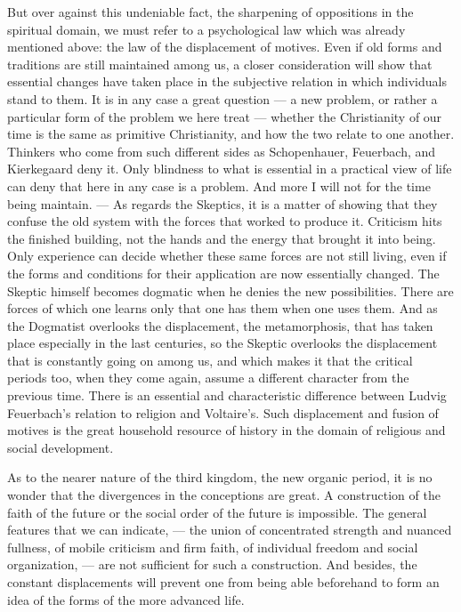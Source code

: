 \documentclass[12pt,a4paper,openany]{book}
\newcommand{\opage}[1]{\marginnote{\footnotesize\textit{[#1]}}}
\begin{document}
But over against this undeniable fact, the sharpening of
oppositions in the spiritual domain, we must refer to
\opage{238}a psychological law which was already mentioned above:
the law of the displacement of motives. Even if old forms and
traditions are still maintained among us, a closer
consideration will show that essential changes have taken place
in the subjective relation in which individuals stand to them.
It is in any case a great question
--- a new problem, or rather a particular form of the
problem we here treat --- whether the Christianity of our time is
the same as primitive Christianity, and how the two
relate to one another. Thinkers who come from such different
sides as Schopenhauer, Feuerbach, and
Kierkegaard deny it. Only blindness to what is essential
in a practical view of life can deny that here
in any case is a problem. And more I will not
for the time being maintain. --- As regards the Skeptics, it is a matter
of showing that they confuse the old system with the
forces that worked to produce it. Criticism
hits the finished building, not the hands and the energy
that brought it into being. Only experience can decide whether
these same forces are not still living, even if the forms and
conditions for their application are now essentially changed.
The Skeptic himself becomes dogmatic when he denies the new
possibilities. There are forces of which one learns only that
one has them when one uses them. And as the Dogmatist
overlooks the displacement, the metamorphosis, that has
taken place especially in the last centuries, so the
Skeptic overlooks the displacement that is constantly going on among us,
and which makes it that the critical periods too, when they come
again, assume a different character from the previous time. There is
an essential and characteristic difference between Ludvig
Feuerbach's relation to religion and Voltaire's. Such
displacement and fusion of motives is the great household resource
of history in the domain of religious and social development.

As to the nearer nature of the third kingdom,
the new organic period, it is no wonder that
the divergences in the conceptions are great. A construction of
the faith of the future or the social order of the future is impossible.
\opage{239}The general features that we can indicate, --- the union of
concentrated strength and nuanced fullness, of mobile criticism
and firm faith, of individual freedom and social organization, ---
are not sufficient for such a construction. And
besides, the constant displacements will prevent one from being able
beforehand to form an idea of the forms of the more
advanced life.
\end{document}
